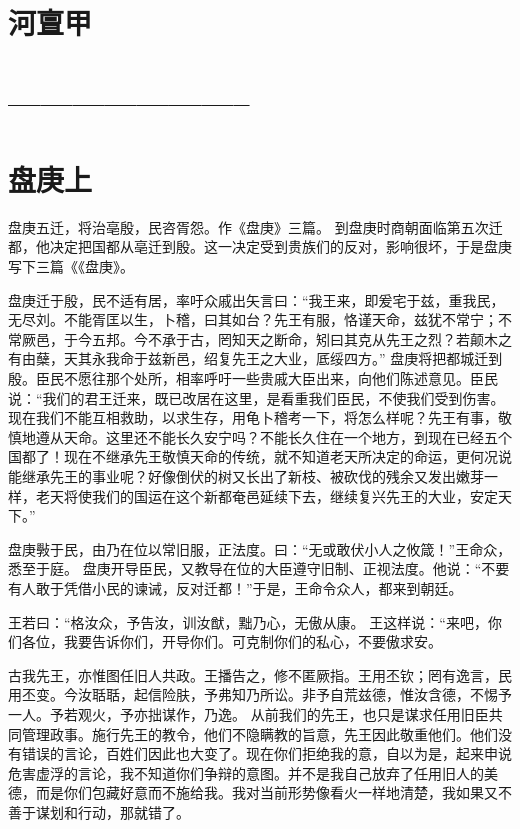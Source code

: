 \documentclass[a4paper,12pt,UTF8,twoside]{ctexbook}
\begin{document}
\chapter{河亶甲}
\chapter{-----------------------}
\chapter{盘庚上}

盘庚五迁，将治亳殷，民咨胥怨。作《盘庚》三篇。
到盘庚时商朝面临第五次迁都，他决定把国都从亳迁到殷。这一决定受到贵族们的反对，影响很坏，于是盘庚写下三篇《《盘庚》。

盘庚迁于殷，民不适有居，率吁众戚出矢言曰：“我王来，即爰宅于兹，重我民，无尽刘。不能胥匡以生，卜稽，曰其如台？先王有服，恪谨天命，兹犹不常宁；不常厥邑，于今五邦。今不承于古，罔知天之断命，矧曰其克从先王之烈？若颠木之有由蘖，天其永我命于兹新邑，绍复先王之大业，厎绥四方。”
盘庚将把都城迁到殷。臣民不愿往那个处所，相率呼吁一些贵戚大臣出来，向他们陈述意见。臣民说：“我们的君王迁来，既已改居在这里，是看重我们臣民，不使我们受到伤害。现在我们不能互相救助，以求生存，用龟卜稽考一下，将怎么样呢？先王有事，敬慎地遵从天命。这里还不能长久安宁吗？不能长久住在一个地方，到现在已经五个国都了！现在不继承先王敬慎天命的传统，就不知道老天所决定的命运，更何况说能继承先王的事业呢？好像倒伏的树又长出了新枝、被砍伐的残余又发出嫩芽一样，老天将使我们的国运在这个新都奄邑延续下去，继续复兴先王的大业，安定天下。”

盘庚斅于民，由乃在位以常旧服，正法度。曰：“无或敢伏小人之攸箴！”王命众，悉至于庭。
盘庚开导臣民，又教导在位的大臣遵守旧制、正视法度。他说：“不要有人敢于凭借小民的谏诫，反对迁都！”于是，王命令众人，都来到朝廷。

王若曰：“格汝众，予告汝，训汝猷，黜乃心，无傲从康。
王这样说：“来吧，你们各位，我要告诉你们，开导你们。可克制你们的私心，不要傲求安。

古我先王，亦惟图任旧人共政。王播告之，修不匿厥指。王用丕钦；罔有逸言，民用丕变。今汝聒聒，起信险肤，予弗知乃所讼。非予自荒兹德，惟汝含德，不惕予一人。予若观火，予亦拙谋作，乃逸。
从前我们的先王，也只是谋求任用旧臣共同管理政事。施行先王的教令，他们不隐瞒教的旨意，先王因此敬重他们。他们没有错误的言论，百姓们因此也大变了。现在你们拒绝我的意，自以为是，起来申说危害虚浮的言论，我不知道你们争辩的意图。并不是我自己放弃了任用旧人的美德，而是你们包藏好意而不施给我。我对当前形势像看火一样地清楚，我如果又不善于谋划和行动，那就错了。
\end{document}
